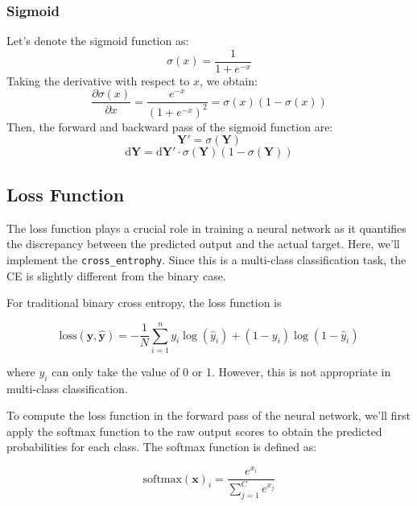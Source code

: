 \documentclass[10pt,a4paper,twoside]{tau}
\renewcommand{\vec}[1]{\mathbf{#1}}
\renewcommand{\d}{\text{d}}
\begin{document}
\subsubsection{Sigmoid}

Let's denote the sigmoid function as:
\begin{equation}
\sigma(x) = \frac{1}{1 + e^{-x}} \tag{3.2.7}
\end{equation}
Taking the derivative with respect to $x$, we obtain:
\begin{equation}
\frac{\partial\sigma(x)}{\partial x} = \frac{e^{-x}}{(1 + e^{-x})^2} = \sigma(x)(1 - \sigma(x)) \tag{3.2.8}
\end{equation}
Then, the forward and backward pass of the sigmoid function are:
\begin{equation}
\vec{Y'} = \sigma(\vec{Y}) \tag{3.2.9}
\end{equation}
\begin{equation}
\d\vec{Y} = \d\vec{Y'}\cdot \sigma(\vec{Y}) (1 - \sigma(\vec{Y})) \tag{3.2.10}
\end{equation}

\subsection{Loss Function}

The loss function plays a crucial role in training a neural network as it quantifies the discrepancy between the predicted output and the actual target. Here, we'll implement the \texttt{cross\_entrophy}. Since this is a multi-class classification task, the CE is slightly different from the binary case.

For traditional binary cross entropy, the loss function is

\begin{equation}
    \text{loss}(\vec{y}, \vec{\hat{y}}) = -\frac{1}{N} \sum_{i=1}^{n}y_i
    \log(\hat{y}_i) + (1 - y_i) \log(1 - \hat{y}_i) \tag{3.3.1}
\end{equation}

where $y_i$ can only take the value of 0 or 1. However, this is not appropriate in multi-class classification.

To compute the loss function in the forward pass of the neural network, we'll first apply the softmax function to the raw output scores to obtain the predicted probabilities for each class. The softmax function is defined as:

\begin{equation}
\text{softmax}(\vec{x})_i = \frac{e^{x_i}}{\sum_{j=1}^{C} e^{x_j}} \tag{3.3.2}
\end{equation}
\end{document}
